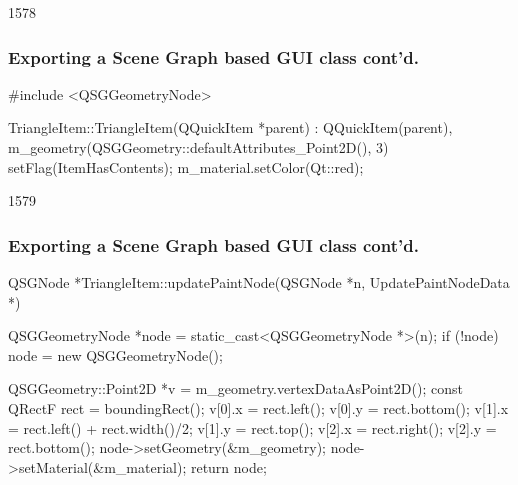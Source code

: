 \begin{slide}[fragile]{1578}\frametitle{Exporting a Scene Graph based GUI class cont'd.}
\begin{cpp}
#include <QSGGeometryNode>

TriangleItem::TriangleItem(QQuickItem *parent)
    : QQuickItem(parent),
      m_geometry(QSGGeometry::defaultAttributes_Point2D(), 3)
{
    setFlag(ItemHasContents);
    m_material.setColor(Qt::red);
}
\end{cpp}
\end{slide}


\begin{slide}[fragile]{1579}\frametitle{Exporting a Scene Graph based GUI class cont'd.}
\begin{cpp}
QSGNode *TriangleItem::updatePaintNode(QSGNode *n, UpdatePaintNodeData *)
{
    QSGGeometryNode *node = static_cast<QSGGeometryNode *>(n);
    if (!node) node = new QSGGeometryNode();

    QSGGeometry::Point2D *v = m_geometry.vertexDataAsPoint2D();
    const QRectF rect = boundingRect();
    v[0].x = rect.left();
    v[0].y = rect.bottom();
    v[1].x = rect.left() + rect.width()/2;
    v[1].y = rect.top();
    v[2].x = rect.right();
    v[2].y = rect.bottom();
    node->setGeometry(&m_geometry);
    node->setMaterial(&m_material);
    return node;
}
\end{cpp}

\end{slide}



